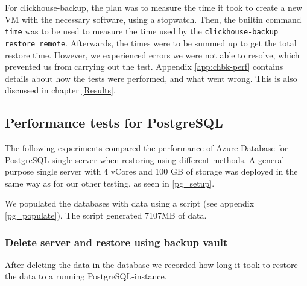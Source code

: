 For clickhouse-backup, the plan was to measure the time it took to create a new VM with the necessary software,
using a stopwatch.
Then, the builtin command \texttt{time} was to be used to measure the time used by the
\texttt{clickhouse-backup restore\_remote}.
Afterwards, the times were to be summed up to get the total restore time.
However, we experienced errors we were not able to resolve, which prevented us from carrying out the test.
Appendix \ref{app:chbk-perf} contains details about how the tests were performed,
and what went wrong.
This is also discussed in chapter \ref{Results}.


\subsection{Performance tests for PostgreSQL}

The following experiments compared the performance of Azure Database for PostgreSQL single server when restoring using different methods. A general purpose single server with 4 vCores and 100 GB of storage was deployed in the same way as for our other testing, as seen in \ref{pg_setup}.

We populated the databases with data using a script (see appendix \ref{pg_populate}). 
The script generated 7107MB of data.

% 


\subsubsection{Delete server and restore using backup vault}

After deleting the data in the database we recorded how long it took to restore the data to a running PostgreSQL-instance. 


